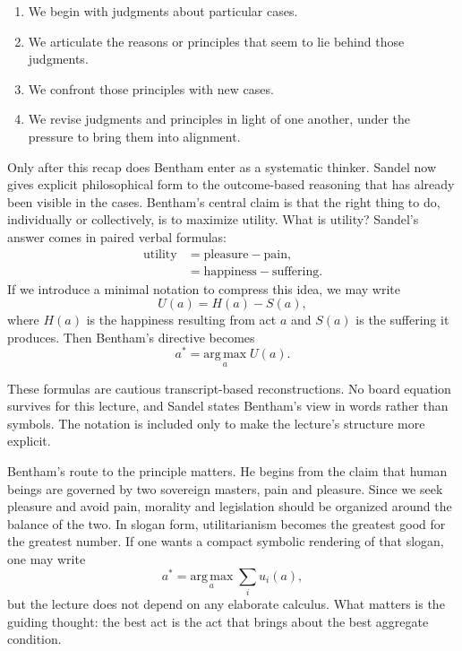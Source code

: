 \begin{enumerate}
\item We begin with judgments about particular cases.
\item We articulate the reasons or principles that seem to lie behind those judgments.
\item We confront those principles with new cases.
\item We revise judgments and principles in light of one another, under the pressure to bring them into alignment.
\end{enumerate}

Only after this recap does Bentham enter as a systematic thinker. Sandel now gives explicit philosophical form to the outcome-based reasoning that has already been visible in the cases. Bentham's central claim is that the right thing to do, individually or collectively, is to maximize utility. What is utility? Sandel's answer comes in paired verbal formulas:
\begin{align}
\text{utility} &= \text{pleasure} - \text{pain}, \\
               &= \text{happiness} - \text{suffering}.
\end{align}
If we introduce a minimal notation to compress this idea, we may write
\begin{equation}
U(a) = H(a) - S(a),
\end{equation}
where \(H(a)\) is the happiness resulting from act \(a\) and \(S(a)\) is the suffering it produces. Then Bentham's directive becomes
\begin{equation}
a^\ast = \underset{a}{\mathrm{arg\,max}}\; U(a).
\end{equation}

\begin{remark}
These formulas are cautious transcript-based reconstructions. No board equation survives for this lecture, and Sandel states Bentham's view in words rather than symbols. The notation is included only to make the lecture's structure more explicit.
\end{remark}

Bentham's route to the principle matters. He begins from the claim that human beings are governed by two sovereign masters, pain and pleasure. Since we seek pleasure and avoid pain, morality and legislation should be organized around the balance of the two. In slogan form, utilitarianism becomes the greatest good for the greatest number. If one wants a compact symbolic rendering of that slogan, one may write
\begin{equation}
a^\ast = \underset{a}{\mathrm{arg\,max}}\; \sum_i u_i(a),
\end{equation}
but the lecture does not depend on any elaborate calculus. What matters is the guiding thought: the best act is the act that brings about the best aggregate condition.

